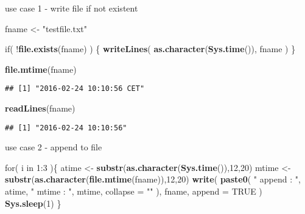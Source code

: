 \documentclass[ignorenonframetext,]{beamer}
\newenvironment{Shaded}{\begin{snugshade}}{\end{snugshade}}
\newcommand{\KeywordTok}[1]{\textcolor[rgb]{0.13,0.29,0.53}{\textbf{{#1}}}}
\newcommand{\DataTypeTok}[1]{\textcolor[rgb]{0.13,0.29,0.53}{{#1}}}
\newcommand{\DecValTok}[1]{\textcolor[rgb]{0.00,0.00,0.81}{{#1}}}
\newcommand{\StringTok}[1]{\textcolor[rgb]{0.31,0.60,0.02}{{#1}}}
\newcommand{\OtherTok}[1]{\textcolor[rgb]{0.56,0.35,0.01}{{#1}}}
\newcommand{\NormalTok}[1]{{#1}}
\begin{document}
\begin{frame}[fragile]{use case 1 - write file if not existent}

\begin{Shaded}
\begin{Highlighting}[]
\NormalTok{fname <-}\StringTok{ "testfile.txt"}

\NormalTok{if( !}\KeywordTok{file.exists}\NormalTok{(fname)  ) \{}
  \KeywordTok{writeLines}\NormalTok{( }\KeywordTok{as.character}\NormalTok{(}\KeywordTok{Sys.time}\NormalTok{()), fname )}
\NormalTok{\}}

\KeywordTok{file.mtime}\NormalTok{(fname)}
\end{Highlighting}
\end{Shaded}

\begin{verbatim}
## [1] "2016-02-24 10:10:56 CET"
\end{verbatim}

\begin{Shaded}
\begin{Highlighting}[]
\KeywordTok{readLines}\NormalTok{(fname)}
\end{Highlighting}
\end{Shaded}

\begin{verbatim}
## [1] "2016-02-24 10:10:56"
\end{verbatim}

\end{frame}

\begin{frame}[fragile]{use case 2 - append to file}

\begin{Shaded}
\begin{Highlighting}[]
\NormalTok{for( i in }\DecValTok{1}\NormalTok{:}\DecValTok{3} \NormalTok{)\{}
  \NormalTok{atime <-}\StringTok{ }\KeywordTok{substr}\NormalTok{(}\KeywordTok{as.character}\NormalTok{(}\KeywordTok{Sys.time}\NormalTok{()),}\DecValTok{12}\NormalTok{,}\DecValTok{20}\NormalTok{)}
  \NormalTok{mtime <-}\StringTok{ }\KeywordTok{substr}\NormalTok{(}\KeywordTok{as.character}\NormalTok{(}\KeywordTok{file.mtime}\NormalTok{(fname)),}\DecValTok{12}\NormalTok{,}\DecValTok{20}\NormalTok{)}
  \KeywordTok{write}\NormalTok{(}
    \KeywordTok{paste0}\NormalTok{(}
      \StringTok{" append : "}\NormalTok{, atime, }\StringTok{"   mtime : "}\NormalTok{, mtime, }
      \DataTypeTok{collapse =} \StringTok{""}
    \NormalTok{), }
    \NormalTok{fname, }
    \DataTypeTok{append =} \OtherTok{TRUE}
  \NormalTok{)}
  \KeywordTok{Sys.sleep}\NormalTok{(}\DecValTok{1}\NormalTok{)}
\NormalTok{\}}
\end{Highlighting}
\end{Shaded}

\end{frame}
\end{document}
